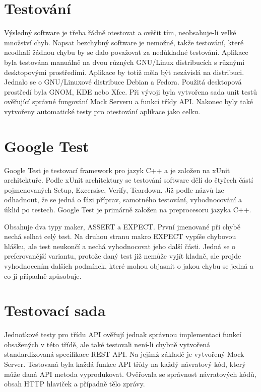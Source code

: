 \section{Testování}

Výsledný software je třeba řádně otestovat a ověřit tím, neobsahuje-li velké množství chyb. Napsat bezchybný software je nemožné, takže testování, které neodhalí
žádnou chybu by se dalo považovat za nedůkladné testování. Aplikace byla testována manuálně na dvou různých GNU/Linux distribucích s různými desktopovými prostředími.
Aplikace by totiž měla být nezávislá na distribuci. Jednalo se o GNU/Linuxové distribuce Debian a Fedora. Použitá desktopová prostředí byla GNOM, KDE nebo Xfce. Při
vývoji byla vytvořena sada unit testů ověřující správné fungování Mock Serveru a funkcí třídy API. Nakonec byly také vytvořeny automatické testy pro otestování aplikace
jako celku.

\section{Google Test}

Google Test je testovací framework pro jazyk C++ a je založen na xUnit architektuře. Podle xUnit architektury se testování software dělí do čtyřech částí pojmenovaných
Setup, Excersise, Verify, Teardown. Již podle názvů lze odhadnout, že se jedná o fázi příprav, samotného testování, vyhodnocování a úklid po testech. Google Test je
primárně založen na preprocesoru jazyka C++.

Obsahuje dva typy maker, ASSERT a EXPECT. První jmenované při chybě nechá selhat celý test. Na druhou stranu makro EXPECT vypíše chybovou hlášku, ale test neukončí a
nechá vyhodnocovat jeho další části. Jedná se o preferovanější variantu, protože daný test již nemůže vyjít kladně, ale projde vyhodnocením dalších podmínek, které
mohou objasnit o jakou chybu se jedná a co ji případně způsobuje.

\section{Testovací sada}

Jednotkové testy pro třídu API ověřují jednak správnou implementaci funkcí obsažených v této třídě, ale také testovali není-li chybně vytvořená standardizovaná
specifikace REST API. Na jejímž základě je vytvořený Mock Server. Testovaná byla každá funkce API třídy na každý návratový kód, který může daná API metoda
vyprodukovat. Ověřovala se správnost návratových kódů, obsah HTTP hlaviček a případně tělo zprávy.

